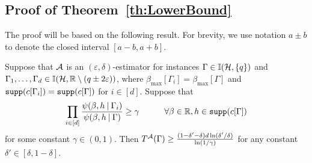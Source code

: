 \documentclass[final,12pt]{colt2018}
\def\bmax{{\beta_{\max}}}
\def\calA{{\cal A}}
\def\calH{{\cal H}}
\begin{document}
\subsection{Proof of Theorem~\ref{th:LowerBound}}\label{sec:th:LowerBound:proof}
The proof will be based on the following result. For brevity, we use notation $a\pm b$ to denote the closed interval $[a-b,a+b]$.
\begin{lemma}\label{lemma:LowerBound:1}
Suppose that $\calA$ is an $(\varepsilon,\delta)$-estimator
for instances  $\Gamma\in\I(\calH,\{q\})$ and $\Gamma_1,\ldots,\Gamma_d\in\I(\calH,\mathbb R\setminus(q\pm 2\varepsilon))$, %
where $\bmax[\Gamma_i]=\bmax[\Gamma]$ and ${\tt supp}(c[\Gamma_i])={\tt supp}(c[\Gamma])$ for $i\in[d]$.
Suppose that
\begin{equation}\label{eq:lemma:LowerBound:1}
 \prod_{i\in[d]}\frac{\psi(\beta,h\:|\:\Gamma_i)}{\psi(\beta,h\:|\:\Gamma)} \ge \gamma\qquad\quad\forall \beta\in\mathbb R,h\in{\tt supp}(c[\Gamma])
\end{equation}
for some constant $\gamma\in(0,1)$. Then $T^\calA(\Gamma)\ge \frac{(1-\delta'-\delta)d\ln (\delta'/\delta)}{\ln (1/\gamma)}$
for any constant $\delta'\in[\delta,1-\delta]$.
\end{lemma}
\end{document}
